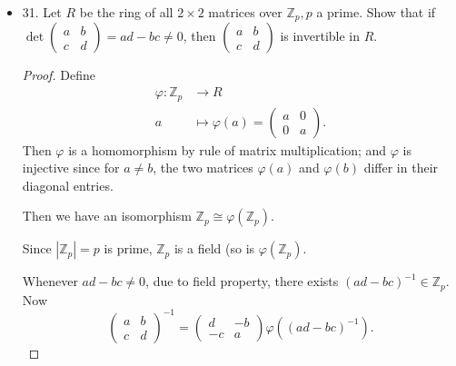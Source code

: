 \begin{itemize}
\begin{proof}
	We only need to show that conjugates of elements in $A \setminus Z(G)$ by elements in $G \setminus Z(G)$ remain inside $A$. Thus we only need to show conjugate of $ \pm i$ by $ \pm i, \pm j, \pm k$ lie in $A$. By since the product between different elements of  $i,j,k$ are anticommutative ($ij = -ji, ik=-ki, jk=-kj$), we may obtain
	\[
		j^{-1} i j = j^{-1} (- j i) = - (j^{-1} j) i = - i \in A
	.\] 
	And the same for  $-j, k, -k$. Finally,
	\[
		i^{-1} i i = (i^{-1}  i) i = i
	.\] 
	and
	\[
		(-i)^{-1} i (-i) = (-i)^{-1} (-i) i = i
	.\] 
	Thus $A$ is normal in $G$.
\end{proof}

\item 31. Let $R$ be the ring of all $2 \times 2$ matrices over $\mathbb{Z}_p, p$ a prime. Show that if $\operatorname{det}\left(\begin{array}{ll}a & b \\ c & d\end{array}\right)=a d-b c \neq 0$, then $\left(\begin{array}{ll}a & b \\ c & d\end{array}\right)$ is invertible in $R$.
\begin{proof}
	Define
	\begin{align*}
		\varphi: \mathbb{Z}_p &\longrightarrow R \\
		a &\longmapsto \varphi(a) = 
		\left(\begin{array}{rr}
	a & 0 \\ 0 & a \end{array}\right)
	.\end{align*}
		Then $\varphi$ is a homomorphism by rule of matrix multiplication; and $\varphi$ is injective since for $a \neq b$, the two matrices $\varphi(a)$ and $\varphi(b)$ differ in their diagonal entries.

	Then we have an isomorphism $\mathbb{Z}_p \cong \varphi(\mathbb{Z}_p)$.

	Since $|\mathbb{Z}_p| = p$ is prime, $\mathbb{Z}_p$ is a field (so is $\varphi(\mathbb{Z}_p)$.


	Whenever $ad - bc \neq  0$, due to field property, there exists $(ad-bc)^{-1} \in \mathbb{Z}_p$. Now	
	\[
	\left(\begin{array}{ll}a & b \\ c & d\end{array}\right)^{-1}=
	\left(\begin{array}{rr}
	d & -b \\ -c & a\end{array}\right)
	 \varphi\left((ad-bc)^{-1}\right)
	.\] 

\end{proof}

\end{itemize}
